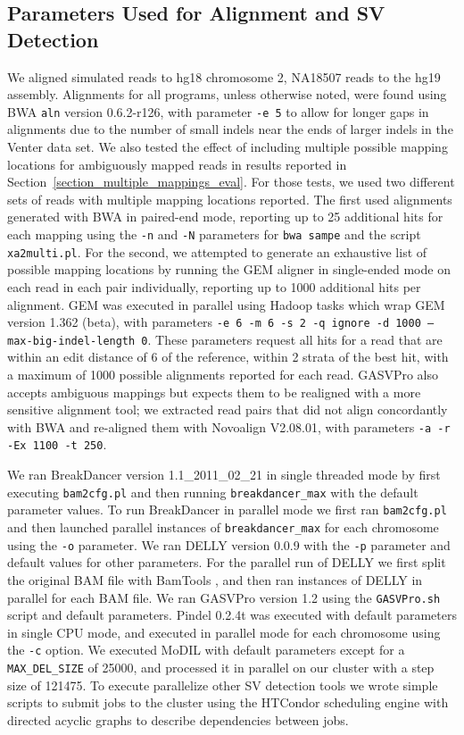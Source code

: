 \subsection{Parameters Used for Alignment and SV Detection}

We aligned simulated reads to hg18 chromosome 2, NA18507 reads to the hg19 assembly. Alignments for all programs, unless otherwise noted, were found using BWA \texttt{aln} version 0.6.2-r126, with parameter \texttt{-e 5} to allow for longer gaps in alignments due to the number of small indels near the ends of larger indels in the Venter data set. We also tested the effect of including multiple possible mapping locations for ambiguously mapped reads in results reported in Section~\ref{section_multiple_mappings_eval}. For those tests, we used two different sets of reads with multiple mapping locations reported. The first used alignments generated with BWA in paired-end mode, reporting up to 25 additional hits for each mapping  using the \texttt{-n} and \texttt{-N} parameters for \texttt{bwa sampe} and the script \texttt{xa2multi.pl}. For the second, we attempted to generate an exhaustive list of possible mapping locations by running the GEM aligner in single-ended mode on each read in each pair individually, reporting up to 1000 additional hits per alignment. GEM was executed in parallel using Hadoop tasks which wrap GEM version 1.362 (beta), with parameters \texttt{-e 6 -m 6 -s 2 -q ignore -d 1000 --max-big-indel-length 0}. These parameters request all hits for a read that are within an edit distance of 6 of the reference, within 2 strata of the best hit, with a maximum of 1000 possible alignments reported for each read. GASVPro also accepts ambiguous mappings but expects them to be realigned with a more sensitive alignment tool; we extracted read pairs that did not align concordantly with BWA and re-aligned them with Novoalign V2.08.01, with parameters \texttt{-a -r -Ex 1100 -t 250}. 

We ran BreakDancer version 1.1\_2011\_02\_21 in single threaded mode by first executing \texttt{bam2cfg.pl} and then running \texttt{breakdancer\_max} with the default parameter values.  To run BreakDancer in parallel mode we first ran \texttt{bam2cfg.pl} and then launched parallel instances of \texttt{breakdancer\_max} for each chromosome using the \texttt{-o} parameter. We ran DELLY version 0.0.9 with the \texttt{-p} parameter and default values for other parameters. For the parallel run of DELLY we first split the original BAM file with BamTools \cite{Barnett:2011hm}, and then ran instances of DELLY in parallel for each BAM file. We ran GASVPro version 1.2 using the \texttt{GASVPro.sh} script and default parameters. Pindel 0.2.4t was executed with default parameters in single CPU mode, and executed in parallel mode for each chromosome using the \texttt{-c} option. We executed MoDIL with default parameters except for a \texttt{MAX\_DEL\_SIZE} of 25000, and processed it in parallel on our cluster with a step size of 121475. To execute parallelize other SV detection tools we wrote simple scripts to submit jobs to the cluster using the HTCondor scheduling engine \cite{condor-practice} with directed acyclic graphs to describe dependencies between jobs. 

